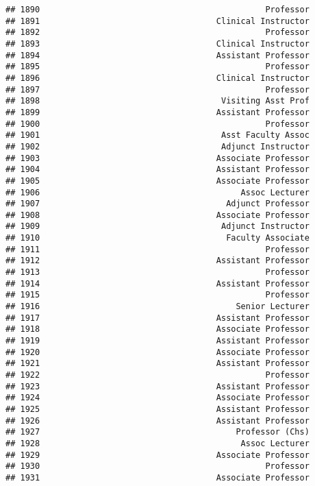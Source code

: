 \documentclass[
]{article}
\begin{document}
\begin{verbatim}
## 1890                                              Professor
## 1891                                    Clinical Instructor
## 1892                                              Professor
## 1893                                    Clinical Instructor
## 1894                                    Assistant Professor
## 1895                                              Professor
## 1896                                    Clinical Instructor
## 1897                                              Professor
## 1898                                     Visiting Asst Prof
## 1899                                    Assistant Professor
## 1900                                              Professor
## 1901                                     Asst Faculty Assoc
## 1902                                     Adjunct Instructor
## 1903                                    Associate Professor
## 1904                                    Assistant Professor
## 1905                                    Associate Professor
## 1906                                         Assoc Lecturer
## 1907                                      Adjunct Professor
## 1908                                    Associate Professor
## 1909                                     Adjunct Instructor
## 1910                                      Faculty Associate
## 1911                                              Professor
## 1912                                    Assistant Professor
## 1913                                              Professor
## 1914                                    Assistant Professor
## 1915                                              Professor
## 1916                                        Senior Lecturer
## 1917                                    Assistant Professor
## 1918                                    Associate Professor
## 1919                                    Assistant Professor
## 1920                                    Associate Professor
## 1921                                    Assistant Professor
## 1922                                              Professor
## 1923                                    Assistant Professor
## 1924                                    Associate Professor
## 1925                                    Assistant Professor
## 1926                                    Assistant Professor
## 1927                                        Professor (Chs)
## 1928                                         Assoc Lecturer
## 1929                                    Associate Professor
## 1930                                              Professor
## 1931                                    Associate Professor

\end{verbatim}
\end{document}
